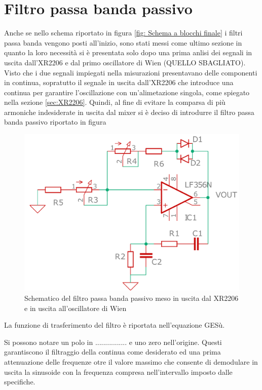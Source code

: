 \documentclass[titlepage]{report}
\begin{document}
\section{Filtro passa banda passivo}
Anche se nello schema riportato in figura \ref{fig: Schema a blocchi finale} i filtri passa banda vengono posti all'inizio, sono stati messi come ultimo sezione in quanto la loro necessità si è presentata solo dopo una prima anlisi dei segnali in uscita dall'XR2206 e dal primo oscillatore di Wien (QUELLO SBAGLIATO). 
\noindent Visto che i due segnali impiegati nella misurazioni presentavano delle componenti in continua, sopratutto il segnale in uscita dall'XR2206 che introduce una continua per garantire l'oscillazione con un'alimetazione singola, come spiegato nella sezione \ref{sec:XR2206}. Quindi, al fine di evitare la comparsa di più armoniche indesiderate in uscita dal mixer si è deciso di introdurre il filtro passa banda passivo riportato in figura 


\begin{figure}[H]
	\centering
	\includegraphics[scale=0.25]{Immagini/sch_osc_wien_cad.pdf}
	\caption{Schematico del filtro passa banda passivo meso in uscita dal XR2206 e in uscita all'oscillatore di Wien}
	\label{fig:antenna}
\end{figure}

La funzione di trasferimento del filtro è riportata nell'equazione GESù.

Si possono notare un polo in ................  e uno zero nell'origine. Questi garantiscono il filtraggio della continua come desiderato ed una prima attenuazione delle frequenze otre il valore massimo che consente di demodulare in uscita la sinusoide con la frequenza compresa nell'intervallo imposto dalle specifiche.
\end{document}
